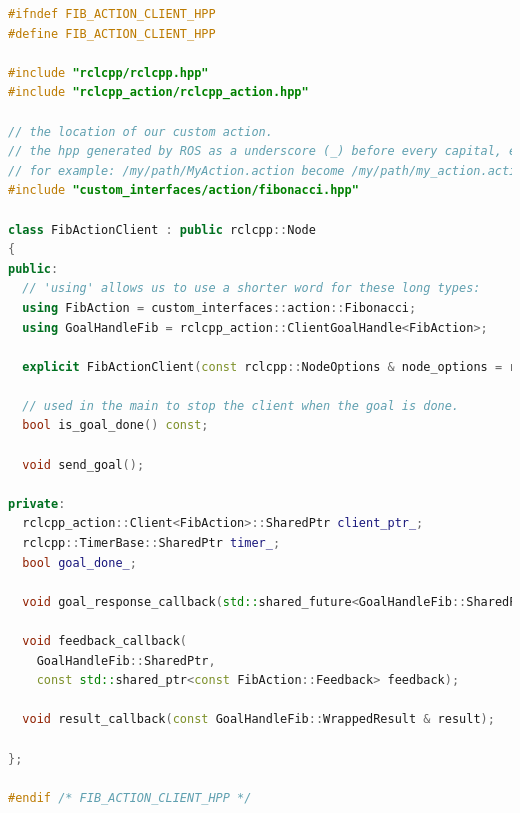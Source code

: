 \begin{lstlisting}[language=C++, caption={ActionClientNode.hpp}, firstnumber=0, label={code:action_client_hpp}]
#ifndef FIB_ACTION_CLIENT_HPP
#define FIB_ACTION_CLIENT_HPP

#include "rclcpp/rclcpp.hpp"
#include "rclcpp_action/rclcpp_action.hpp"

// the location of our custom action.
// the hpp generated by ROS as a underscore (_) before every capital, expect the first:
// for example: /my/path/MyAction.action become /my/path/my_action.action
#include "custom_interfaces/action/fibonacci.hpp"

class FibActionClient : public rclcpp::Node
{
public:
  // 'using' allows us to use a shorter word for these long types:
  using FibAction = custom_interfaces::action::Fibonacci;
  using GoalHandleFib = rclcpp_action::ClientGoalHandle<FibAction>;

  explicit FibActionClient(const rclcpp::NodeOptions & node_options = rclcpp::NodeOptions());

  // used in the main to stop the client when the goal is done.
  bool is_goal_done() const;

  void send_goal();

private:
  rclcpp_action::Client<FibAction>::SharedPtr client_ptr_;
  rclcpp::TimerBase::SharedPtr timer_;
  bool goal_done_;

  void goal_response_callback(std::shared_future<GoalHandleFib::SharedPtr> future);

  void feedback_callback(
    GoalHandleFib::SharedPtr,
    const std::shared_ptr<const FibAction::Feedback> feedback);

  void result_callback(const GoalHandleFib::WrappedResult & result);

}; 

#endif /* FIB_ACTION_CLIENT_HPP */
\end{lstlisting}

